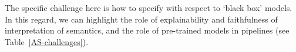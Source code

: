 \documentclass[sigconf,nonacm]{acmart}%
\begin{document}
The specific challenge here is how to specify with respect to `black box' models. In this regard, we can highlight the role of explainability and faithfulness of interpretation of semantics, and the role of pre-trained models in pipelines (see Table~\ref{AS-challenges}). 

\footnotesize
\end{document}
